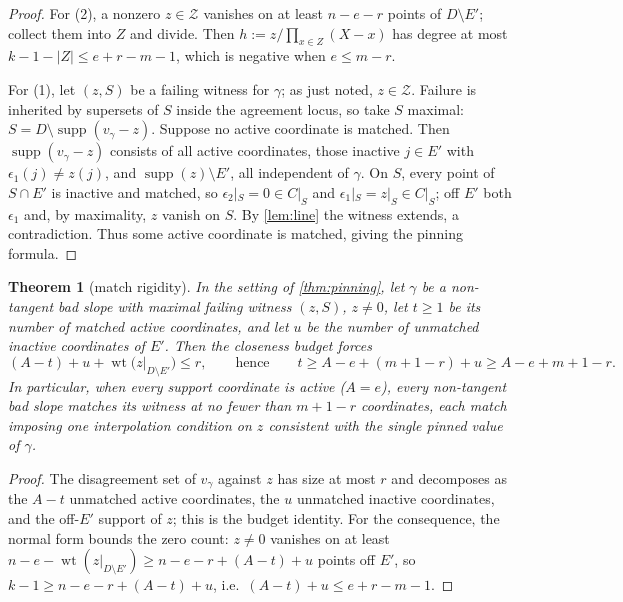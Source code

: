 \documentclass[11pt]{amsart}
\newtheorem{theorem}{Theorem}[section]
\theoremstyle{definition}
\theoremstyle{remark}
\newcommand{\wt}{\operatorname{wt}}
\newcommand{\supp}{\operatorname{supp}}
\begin{document}
\begin{proof}
For (2), a nonzero $z\in\mathcal Z$ vanishes on at least $n-e-r$ points of $D\setminus E'$; collect them into $Z$ and divide.  Then $h:=z/\prod_{x\in Z}(X-x)$ has degree at most $k-1-|Z|\le e+r-m-1$, which is negative when $e\le m-r$.

For (1), let $(z,S)$ be a failing witness for $\gamma$; as just noted, $z\in\mathcal Z$.  Failure is inherited by supersets of $S$ inside the agreement locus, so take $S$ maximal: $S=D\setminus\supp(v_\gamma-z)$.  Suppose no active coordinate is matched.  Then $\supp(v_\gamma-z)$ consists of all active coordinates, those inactive $j\in E'$ with $\epsilon_1(j)\ne z(j)$, and $\supp(z)\setminus E'$, all independent of $\gamma$.  On $S$, every point of $S\cap E'$ is inactive and matched, so $\epsilon_2|_S=0\in C|_S$ and $\epsilon_1|_S=z|_S\in C|_S$; off $E'$ both $\epsilon_1$ and, by maximality, $z$ vanish on $S$.  By \cref{lem:line} the witness extends, a contradiction.  Thus some active coordinate is matched, giving the pinning formula.
\end{proof}

\begin{theorem}[match rigidity]\label{thm:rigidity}
In the setting of \cref{thm:pinning}, let $\gamma$ be a non-tangent bad slope with maximal failing witness $(z,S)$, $z\ne0$, let $t\ge1$ be its number of matched active coordinates, and let $u$ be the number of unmatched inactive coordinates of $E'$.  Then the closeness budget forces
\[
        (A-t)+u+\wt\bigl(z|_{D\setminus E'}\bigr)\le r,
        \qquad\text{hence}\qquad
        t\ge A-e+(m+1-r)+u\ge A-e+m+1-r .
\]
In particular, when every support coordinate is active ($A=e$), every non-tangent bad slope matches its witness at no fewer than $m+1-r$ coordinates, each match imposing one interpolation condition on $z$ consistent with the single pinned value of $\gamma$.
\end{theorem}

\begin{proof}
The disagreement set of $v_\gamma$ against $z$ has size at most $r$ and decomposes as the $A-t$ unmatched active coordinates, the $u$ unmatched inactive coordinates, and the off-$E'$ support of $z$; this is the budget identity.  For the consequence, the normal form bounds the zero count: $z\ne0$ vanishes on at least $n-e-\wt(z|_{D\setminus E'})\ge n-e-r+(A-t)+u$ points off $E'$, so $k-1\ge n-e-r+(A-t)+u$, i.e.\ $(A-t)+u\le e+r-m-1$.
\end{proof}
\end{document}
